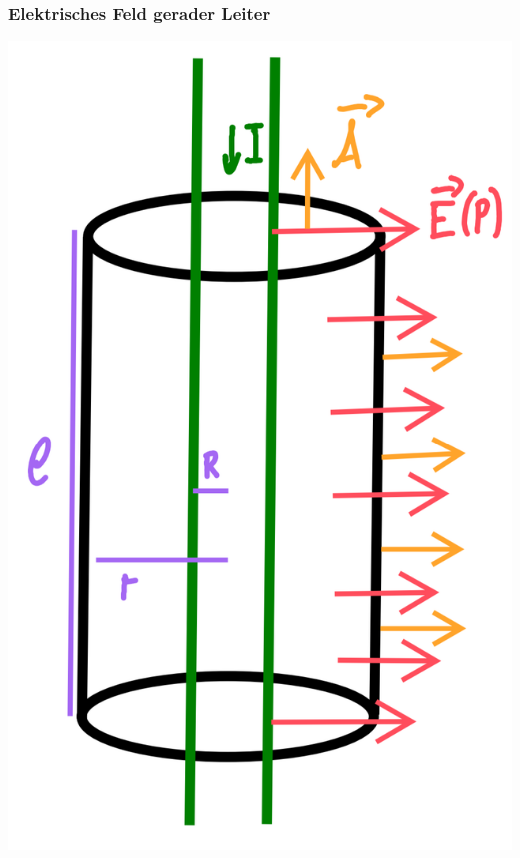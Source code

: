     \subsubsection{Elektrisches Feld gerader Leiter}
        \begin{minipage}{0.39\linewidth}
            \includegraphics[width = \linewidth]{src/images/e-feld_gerader_leiter.png}
        \end{minipage}
